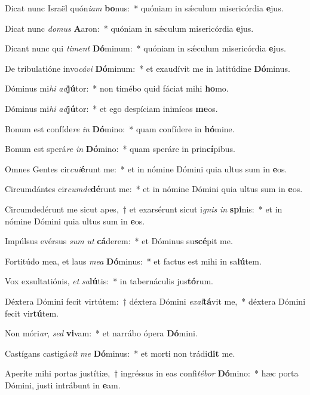 \item Dicat nunc Israël quón\textit{i}\textit{am} \textbf{bo}nus:~* quóniam in sǽculum misericórdia \textbf{e}jus.
\item Dicat nunc \textit{do}\textit{mus} \textbf{A}aron:~* quóniam in sǽculum misericórdia \textbf{e}jus.
\item Dicant nunc qui \textit{ti}\textit{ment} \textbf{Dó}minum:~* quóniam in sǽculum misericórdia \textbf{e}jus.
\item De tribulatióne invo\textit{cá}\textit{vi} \textbf{Dó}minum:~* et exaudívit me in latitúdine \textbf{Dó}minus.
\item Dóminus mi\textit{hi} \textit{ad}\textbf{jú}tor:~* non timébo quid fáciat mihi \textbf{ho}mo.
\item Dóminus mi\textit{hi} \textit{ad}\textbf{jú}tor:~* et ego despíciam inimícos \textbf{me}os.
\item Bonum est confíde\textit{re} \textit{in} \textbf{Dó}mino:~* quam confídere in \textbf{hó}mine.
\item Bonum est sperá\textit{re} \textit{in} \textbf{Dó}mino:~* quam speráre in prin\textbf{cí}pibus.
\item Omnes Gentes cir\textit{cu}\textit{i}\textbf{é}runt me:~* et in nómine Dómini quia ultus sum in \textbf{e}os.
\item Circumdántes cir\textit{cum}\textit{de}\textbf{dé}runt me:~* et in nómine Dómini quia ultus sum in \textbf{e}os.
\item Circumdedérunt me sicut apes,~† et exarsérunt sicut i\textit{gnis} \textit{in} \textbf{spi}nis:~* et in nómine Dómini quia ultus sum in \textbf{e}os.
\item Impúlsus evérsus \textit{sum} \textit{ut} \textbf{cá}derem:~* et Dóminus su\textbf{scé}pit me.
\item Fortitúdo mea, et laus \textit{me}\textit{a} \textbf{Dó}minus:~* et factus est mihi in sa\textbf{lú}tem.
\item Vox exsultatiónis, \textit{et} \textit{sa}\textbf{lú}tis:~* in tabernáculis jus\textbf{tó}rum.
\item Déxtera Dómini fecit virtútem:~† déxtera Dómini \textit{ex}\textit{al}\textbf{tá}vit me,~* déxtera Dómini fecit vir\textbf{tú}tem.
\item Non móri\textit{ar}, \textit{sed} \textbf{vi}vam:~* et narrábo ópera \textbf{Dó}mini.
\item Castígans castigá\textit{vit} \textit{me} \textbf{Dó}minus:~* et morti non trádi\textbf{dit} me.
\item Aperíte mihi portas justítiæ,~† ingréssus in eas confi\textit{té}\textit{bor} \textbf{Dó}mino:~* hæc porta Dómini, justi intrábunt in \textbf{e}am.
